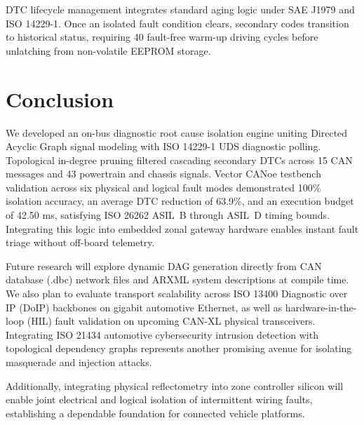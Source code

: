 \documentclass[conference]{IEEEtran}
\begin{document}
DTC lifecycle management integrates standard aging logic under SAE J1979 and ISO 14229-1. Once an isolated fault condition clears, secondary codes transition to historical status, requiring 40 fault-free warm-up driving cycles before unlatching from non-volatile EEPROM storage.

\section{Conclusion}
We developed an on-bus diagnostic root cause isolation engine uniting Directed Acyclic Graph signal modeling with ISO 14229-1 UDS diagnostic polling. Topological in-degree pruning filtered cascading secondary DTCs across 15 CAN messages and 43 powertrain and chassis signals. Vector CANoe testbench validation across six physical and logical fault modes demonstrated 100\% isolation accuracy, an average DTC reduction of 63.9\%, and an execution budget of 42.50 ms, satisfying ISO 26262 ASIL~B through ASIL~D timing bounds. Integrating this logic into embedded zonal gateway hardware enables instant fault triage without off-board telemetry.

Future research will explore dynamic DAG generation directly from CAN database (.dbc) network files and ARXML system descriptions at compile time. We also plan to evaluate transport scalability across ISO 13400 Diagnostic over IP (DoIP) backbones on gigabit automotive Ethernet, as well as hardware-in-the-loop (HIL) fault validation on upcoming CAN-XL physical transceivers. Integrating ISO 21434 automotive cybersecurity intrusion detection with topological dependency graphs represents another promising avenue for isolating masquerade and injection attacks.

Additionally, integrating physical reflectometry into zone controller silicon will enable joint electrical and logical isolation of intermittent wiring faults, establishing a dependable foundation for connected vehicle platforms.
\end{document}

